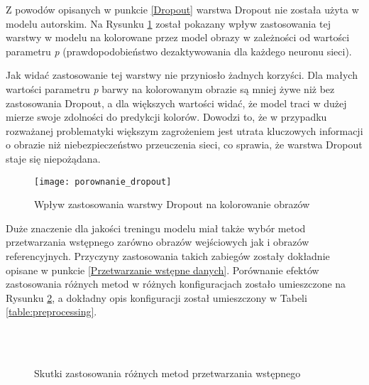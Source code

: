   Z powodów opisanych w punkcie \ref{Dropout} warstwa Dropout nie została użyta
  w modelu autorskim. Na Rysunku \ref{fig:porownanie_dropout} został pokazany
  wpływ zastosowania tej warstwy w modelu na kolorowane przez model obrazy w zależności od
  wartości parametru \textit{p} (prawdopodobieństwo dezaktywowania dla każdego
  neuronu sieci).

  \noindent
  Jak widać zastosowanie tej warstwy nie przyniosło żadnych korzyści. Dla
  małych wartości parametru \textit{p} barwy na kolorowanym obrazie są
  mniej żywe niż bez zastosowania Dropout, a dla większych wartości widać, że
  model traci w dużej mierze swoje zdolności do predykcji kolorów. Dowodzi to,
  że w przypadku rozważanej problematyki większym zagrożeniem jest utrata
  kluczowych informacji o obrazie niż niebezpieczeństwo przeuczenia sieci, co
  sprawia, że warstwa Dropout staje się niepożądana.

  \begin{figure}[H]
   \centering
   \captionsetup{justification=centering}
   \texttt{[image: porownanie\_dropout]}
   \caption[Wpływ zastosowania warstwy Dropout na kolorowanie obrazów - źródło: rysunek własny na podstawie:
   \url{https://pl.wikipedia.org/wiki/Plik:PL_Bagno_Calowanie_2.jpg}]
   {Wpływ zastosowania warstwy Dropout na kolorowanie obrazów}
   \label{fig:porownanie_dropout}
  \end{figure}

  Duże znaczenie dla jakości treningu modelu miał także wybór metod przetwarzania
  wstępnego zarówno obrazów wejściowych jak i obrazów referencyjnych. Przyczyny
  zastosowania takich zabiegów zostały dokładnie opisane w punkcie
  \ref{Przetwarzanie wstępne danych}.
  Porównanie efektów zastosowania różnych metod w różnych konfiguracjach zostało umieszczone
  na Rysunku \ref{fig:porownanie_preprocessing}, a dokładny opis konfiguracji
  został umieszczony w Tabeli \ref{table:preprocessing}.

  \begin{figure}[ht!]
    \centering
    \captionsetup{justification=centering}
     \\
     \\
    \caption[Skutki zastosowania różnych metod przetwarzania wstępnego - źródło:
    rysunek własny na podstawie
    \url{https://pl.wikipedia.org/wiki/Plik:PL_Bagno_Calowanie_2.jpg}]
    {Skutki zastosowania różnych metod przetwarzania wstępnego}
    \label{fig:porownanie_preprocessing}
  \end{figure}

